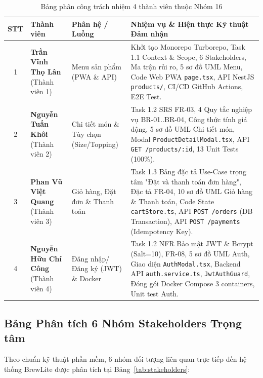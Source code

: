 \documentclass[a4paper]{article}
\begin{document}
\begin{table}[H]
\centering
\small
\begin{tabular}{|c|>{\raggedright\arraybackslash}p{3.2cm}|>{\raggedright\arraybackslash}p{3.8cm}|>{\raggedright\arraybackslash}p{6.8cm}|}
\hline
\textbf{STT} & \textbf{Thành viên} & \textbf{Phân hệ / Luồng} & \textbf{Nhiệm vụ \& Hiện thực Kỹ thuật Đảm nhận} \\ \hline
1 & \textbf{Trần Vĩnh Thọ Lân} \newline (Thành viên 1) & Menu sản phẩm (PWA \& API) & Khởi tạo Monorepo Turborepo, Task 1.1 Context \& Scope, 6 Stakeholders, Ma trận rủi ro, 5 sơ đồ UML Menu, Code Web PWA \texttt{page.tsx}, API NestJS \texttt{products/}, CI/CD GitHub Actions, E2E Test. \\ \hline
2 & \textbf{Nguyễn Tuấn Khôi} \newline (Thành viên 2) & Chi tiết món \& Tùy chọn (Size/Topping) & Task 1.2 SRS FR-03, 4 Quy tắc nghiệp vụ BR-01..BR-04, Công thức tính giá động, 5 sơ đồ UML Chi tiết món, Modal \texttt{ProductDetailModal.tsx}, API \texttt{GET /products/:id}, 13 Unit Tests (100\%). \\ \hline
3 & \textbf{Phan Vũ Việt Quang} \newline (Thành viên 3) & Giỏ hàng, Đặt đơn \& Thanh toán & Task 1.3 Bảng đặc tả Use-Case trọng tâm "Đặt và thanh toán đơn hàng", Đặc tả FR-04, 10 sơ đồ UML Giỏ hàng \& Thanh toán, Code State \texttt{cartStore.ts}, API \texttt{POST /orders} (DB Transaction), API \texttt{POST /payments} (Idempotency Key). \\ \hline
4 & \textbf{Nguyễn Hữu Chí Công} \newline (Thành viên 4) & Đăng nhập/Đăng ký (JWT) \& Docker & Task 1.2 NFR Bảo mật JWT \& Bcrypt (Salt=10), FR-08, 5 sơ đồ UML Auth, Giao diện \texttt{AuthModal.tsx}, Backend API \texttt{auth.service.ts}, \texttt{JwtAuthGuard}, Đóng gói Docker Compose 3 containers, Unit test Auth. \\ \hline
\end{tabular}
\caption{Bảng phân công trách nhiệm 4 thành viên thuộc Nhóm 16}
\label{tab:phan_cong_nhom}
\end{table}

\subsection{Bảng Phân tích 6 Nhóm Stakeholders Trọng tâm}
Theo chuẩn kỹ thuật phần mềm, 6 nhóm đối tượng liên quan trực tiếp đến hệ thống BrewLite được phân tích tại Bảng~\ref{tab:stakeholders}:
\end{document}
